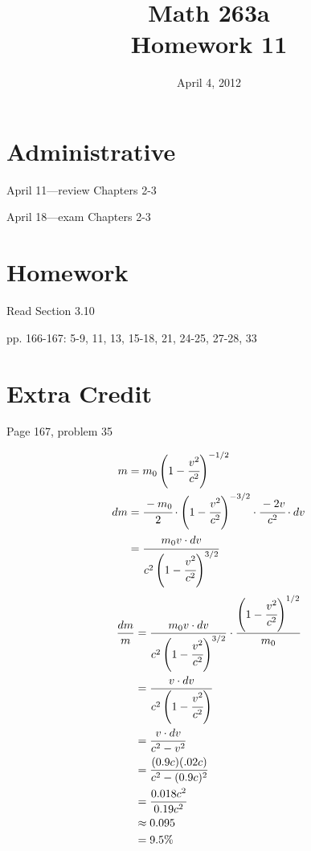 \documentclass[fleqn]{exam}
\title{Math 263a \\ Homework 11}
\date{April 4, 2012}
\begin{document}
\maketitle

\ifprintanswers
\else
\section{Administrative}
\begin{itemize*}
  \item April 11---review Chapters 2-3
  \item April 18---exam Chapters 2-3
\end{itemize*}

\fi

\section{Homework}

\begin{itemize*}
  \item Read Section 3.10
  \item pp. 166-167: 5-9, 11, 13, 15-18, 21, 24-25, 27-28, 33
\end{itemize*}

\section{Extra Credit}
Page 167, problem 35

\begin{align*}
  m &= m_0 \left( 1 - \cfrac{v^2}{c^2} \right)^{-1/2} \\
  dm &= \cfrac{-m_0}{2} \cdot \left( 1 - \cfrac{v^2}{c^2} \right)^{-3/2} \cdot \cfrac{-2v}{c^2} \cdot dv \\
     &= \cfrac{m_0v \cdot dv}{c^2 \left( 1 - \cfrac{v^2}{c^2} \right)^{3/2}} \\
\end{align*}
\begin{align*}
  \frac{dm}{m} &= \frac{m_0v \cdot dv}{c^2 \left( 1 - \cfrac{v^2}{c^2} \right)^{3/2}} 
                   \cdot \frac{\left( 1 - \cfrac{v^2}{c^2} \right)^{1/2}}{m_0} \\
                &= \frac{v \cdot dv}{c^2 \left( 1 - \cfrac{v^2}{c^2} \right)} \\
                &= \frac{v \cdot dv}{c^2 -v^2} \\
                &= \frac{(0.9c)(.02c)}{c^2 - (0.9c)^2} \\
                &= \frac{0.018c^2}{0.19c^2} \\
                &\approx 0.095 \\
                &= 9.5 \% \\
\end{align*}
\end{document}
